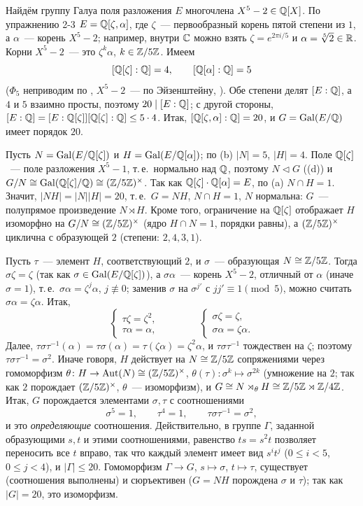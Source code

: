 \begin{example}[3.23]
Найдём группу Галуа поля разложения $E$ многочлена $X^5-2\in\mathbb Q[X]$. По упражнению 2-3 $E=\mathbb Q[\zeta,\alpha]$, где $\zeta$~---
первообразный корень пятой степени из $1$, а $\alpha$~--- корень $X^5-2$; например, внутри $\mathbb C$ можно взять
$\zeta=e^{2\pi i/5}$ и $\alpha=\sqrt[5]2\in\mathbb R$. Корни $X^5-2$~--- это $\zeta^k\alpha$, $k\in\mathbb Z/5\mathbb Z$. Имеем
\[
[\mathbb Q[\zeta]:\mathbb Q]=4,\qquad[\mathbb Q[\alpha]:\mathbb Q]=5
\]
($\Phi_5$ неприводим по , $X^5-2$~--- по Эйзенштейну, ). Обе степени делят $[E:\mathbb Q]$, а $4$ и $5$ взаимно
просты, поэтому $20\mid[E:\mathbb Q]$; с другой стороны, $[E:\mathbb Q]=[E:\mathbb Q[\zeta]][\mathbb Q[\zeta]:\mathbb Q]\le5\cdot4$. Итак, $[\mathbb Q[\zeta,\alpha]:\mathbb Q]=20$, и
$G=\operatorname{Gal}(E/\mathbb Q)$ имеет порядок $20$.

Пусть $N=\operatorname{Gal}(E/\mathbb Q[\zeta])$ и $H=\operatorname{Gal}(E/\mathbb Q[\alpha])$; по (b) $|N|=5$, $|H|=4$. Поле $\mathbb Q[\zeta]$~--- поле разложения
$X^5-1$, т.\,е.\ нормально над $\mathbb Q$, поэтому $N\triangleleft G$ ((d)) и $G/N\cong\operatorname{Gal}(\mathbb Q[\zeta]/\mathbb Q)\cong(\mathbb Z/5\mathbb Z)^\times$. Так как
$\mathbb Q[\zeta]\cdot\mathbb Q[\alpha]=E$, по (a) $N\cap H=1$. Значит, $|NH|=|N||H|=20$, т.\,е.\ $G=NH$, $N\cap H=1$, $N$
нормальна: $G$~--- полупрямое произведение $N\rtimes H$. Кроме того, ограничение на $\mathbb Q[\zeta]$ отображает $H$ изоморфно на
$G/N\cong(\mathbb Z/5\mathbb Z)^\times$ (ядро $H\cap N=1$, порядки равны), а $(\mathbb Z/5\mathbb Z)^\times$ циклична с образующей $2$ (степени: $2,4,3,1$).

Пусть $\tau$~--- элемент $H$, соответствующий $2$, и $\sigma$~--- образующая $N\cong\mathbb Z/5\mathbb Z$. Тогда $\sigma\zeta=\zeta$ (так как
$\sigma\in\operatorname{Gal}(E/\mathbb Q[\zeta])$), а $\sigma\alpha$~--- корень $X^5-2$, отличный от $\alpha$ (иначе $\sigma=1$), т.\,е.\ $\sigma\alpha=\zeta^j\alpha$,
$j\not\equiv0$; заменив $\sigma$ на $\sigma^{j'}$ с $jj'\equiv1\pmod5$, можно считать $\sigma\alpha=\zeta\alpha$. Итак,
\[
\begin{cases}\tau\zeta=\zeta^2,\\ \tau\alpha=\alpha,\end{cases}\qquad\qquad\begin{cases}\sigma\zeta=\zeta,\\ \sigma\alpha=\zeta\alpha.\end{cases}
\]
Далее, $\tau\sigma\tau^{-1}(\alpha)=\tau\sigma(\alpha)=\tau(\zeta\alpha)=\zeta^2\alpha$, и $\tau\sigma\tau^{-1}$ тождествен на $\zeta$; поэтому
$\tau\sigma\tau^{-1}=\sigma^2$. Иначе говоря, $H$ действует на $N\cong\mathbb Z/5\mathbb Z$ сопряжениями через гомоморфизм
$\theta\colon H\to\operatorname{Aut}(N)\cong(\mathbb Z/5\mathbb Z)^\times$, $\theta(\tau)\colon\sigma^k\mapsto\sigma^{2k}$ (умножение на $2$; так как $2$
порождает $(\mathbb Z/5\mathbb Z)^\times$, $\theta$~--- изоморфизм), и $G\cong N\rtimes_\theta H\cong\mathbb Z/5\mathbb Z\rtimes\mathbb Z/4\mathbb Z$. Итак, $G$ порождается элементами $\sigma,\tau$ с соотношениями
\[
\sigma^5=1,\qquad\tau^4=1,\qquad\tau\sigma\tau^{-1}=\sigma^2,
\]
и это \emph{определяющие} соотношения. Действительно, в группе $\Gamma$, заданной образующими $s,t$ и этими соотношениями,
равенство $ts=s^2t$ позволяет переносить все $t$ вправо, так что каждый элемент имеет вид $s^it^j$ ($0\le i<5$, $0\le j<4$), и
$|\Gamma|\le20$. Гомоморфизм $\Gamma\to G$, $s\mapsto\sigma$, $t\mapsto\tau$, существует (соотношения выполнены) и сюръективен ($G=NH$
порождена $\sigma$ и $\tau$); так как $|G|=20$, это изоморфизм.


\end{example}
